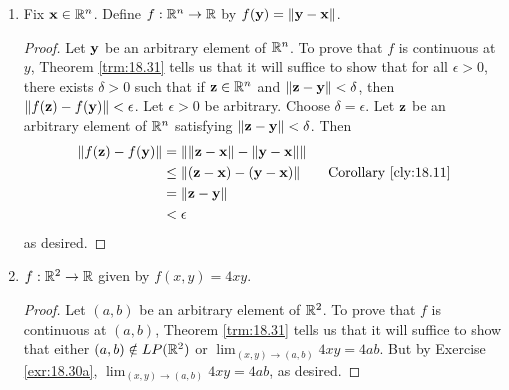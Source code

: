 \documentclass[../main.tex]{subfiles}
\begin{document}
\begin{exercise}
\begin{enumerate}[label={(\alph*)},ref={\theexercise\alph*}]
\begin{proof}
\begin{align*}
                \norm{f(y)-f(x)} &= \norm{y\mathbf{a}-x\mathbf{a}}\\
                &= \norm{(y-x)\mathbf{a}}\\
                &= |y-x|\cdot\norm{\mathbf{a}}\tag*{Theorem \ref{trm:18.10}}\\
                &< \frac{\epsilon}{\norm{\mathbf{a}}}\cdot\norm{\mathbf{a}}\\
                &= \epsilon
            \end{align*}
            as desired.
        \end{proof}
        \item \label{exr:18.32c}Fix $\mathbf{x}\in\mathbb{R}^n$. Define $f:\mathbb{R}^n\to\mathbb{R}$ by $f(\mathbf{y})=\norm{\mathbf{y}-\mathbf{x}}$.
        \begin{proof}
            Let $\mathbf{y}$ be an arbitrary element of $\mathbb{R}^n$. To prove that $f$ is continuous at $y$, Theorem \ref{trm:18.31} tells us that it will suffice to show that for all $\epsilon>0$, there exists $\delta>0$ such that if $\mathbf{z}\in\mathbb{R}^n$ and $\norm{\mathbf{z}-\mathbf{y}}<\delta$, then $\norm{f(\mathbf{z})-f(\mathbf{y})}<\epsilon$. Let $\epsilon>0$ be arbitrary. Choose $\delta=\epsilon$. Let $\mathbf{z}$ be an arbitrary element of $\mathbb{R}^n$ satisfying $\norm{\mathbf{z}-\mathbf{y}}<\delta$. Then
            \begin{align*}
                \norm{f(\z)-f(\y)} &= \norm{\norm{\z-\x}-\norm{\y-\x}}\\
                &\leq \norm{(\z-\x)-(\y-\x)}\tag*{Corollary \ref{cly:18.11}}\\
                &= \norm{\z-\y}\\
                &< \epsilon
            \end{align*}
            as desired.
        \end{proof}
        \item \label{exr:18.32d}$f:\mathbb{R}^2\to\mathbb{R}$ given by $f(x,y)=4xy$.
        \begin{proof}
            Let $(a,b)$ be an arbitrary element of $\mathbb{R}^2$. To prove that $f$ is continuous at $(a,b)$, Theorem \ref{trm:18.31} tells us that it will suffice to show that either $(a,b)\notin LP(\mathbb{R}^2)$ or $\lim_{(x,y)\to(a,b)}4xy=4ab$. But by Exercise \ref{exr:18.30a}, $\lim_{(x,y)\to(a,b)}4xy=4ab$, as desired.
        \end{proof}
    \end{enumerate}
\end{exercise}
\end{document}
